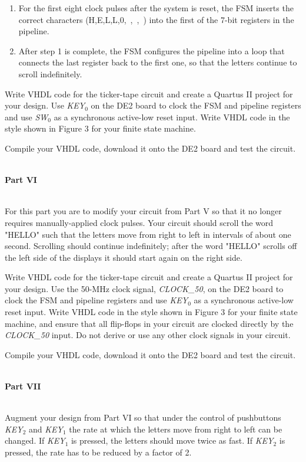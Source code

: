 \documentclass[epsfig,10pt,fullpage]{article}
\begin{document}
\begin{enumerate}
\item
For the first eight clock pulses after the system is reset, the FSM 
inserts the correct characters (H,E,L,L,0,~,~,~) into the first of the 7-bit registers
in the pipeline.
\item
After step 1 is complete, the FSM configures the pipeline into
a loop that connects the last register back to the first one, 
so that the letters continue to scroll indefinitely.
\end{enumerate}

\noindent
Write VHDL code for the ticker-tape circuit and create a Quartus II
project for your design. Use {\it KEY}$_0$
on the DE2 board to clock the FSM and pipeline registers and use 
{\it SW}$_0$ as a synchronous active-low reset input. Write VHDL code 
in the style shown in Figure 3 for your finite state machine.

Compile your VHDL code, download it onto the DE2 board and test the circuit. 

~\\
\noindent
{\bf Part VI}

~\\
\noindent
For this part you are to modify your circuit from Part V so that it no longer
requires manually-applied clock pulses. 
Your circuit should scroll the word "HELLO" such that the
letters move from right to left in intervals of about one second.
Scrolling should continue indefinitely; after the word "HELLO" scrolls
off the left side of the displays it should start again on the right side. 

\noindent
Write VHDL code for the ticker-tape circuit and create a Quartus II
project for your design. Use the 50-MHz clock signal, {\it CLOCK\_50},
on the DE2 board to clock the FSM and pipeline registers and use 
{\it KEY}$_0$ as a synchronous active-low reset input. Write VHDL code 
in the style shown in Figure 3 for your finite state machine, 
and ensure that all flip-flops in your circuit are clocked directly by the 
{\it CLOCK\_50} input. Do not derive or use any other clock signals 
in your circuit.

Compile your VHDL code, download it onto the DE2 board and test the circuit. 

~\\
\noindent
{\bf Part VII}

~\\
\noindent
Augment your design from Part VI so that under the control of pushbuttons
{\it KEY}$_2$ and {\it KEY}$_1$ the rate at which the letters move from right to left
can be changed. If {\it KEY}$_1$ is pressed, the letters should move twice as fast.
If {\it KEY}$_2$ is pressed, the rate has to be reduced by a factor of 2.
\end{document}
